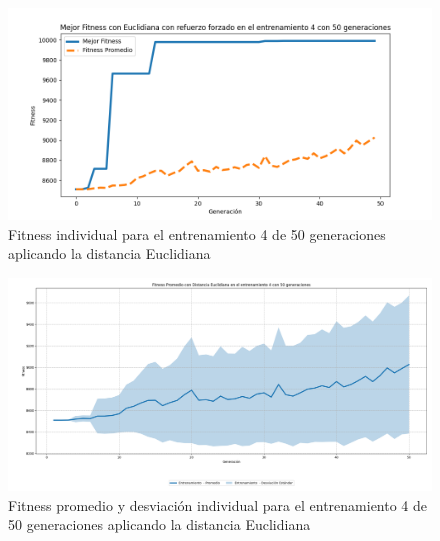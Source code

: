 \documentclass[lettersize, journal]{IEEEtran}
\begin{document}
\begin{figure}[H]
    \centering
    \includegraphics[width=0.9\linewidth]{Euclidiana/Fitnes_individual/Fitness_4_Eucli_50Gen.png}
    \caption{Fitness individual para el entrenamiento 4 de 50 generaciones aplicando la distancia Euclidiana}
    \label{fig:Fitnes_ecu_4_50_inv}
\end{figure}
\begin{figure}[H]
    \centering
    \includegraphics[width=0.9\linewidth]{Euclidiana/Fitnes_individual/Fitness_4_Eucli_50Gen_Sombra.png}
    \caption{Fitness promedio y desviación individual para el entrenamiento 4 de 50 generaciones aplicando la distancia Euclidiana}
    \label{fig:Fitnes_ecu_4_50_inv_sombra}
\end{figure}

\end{document}
